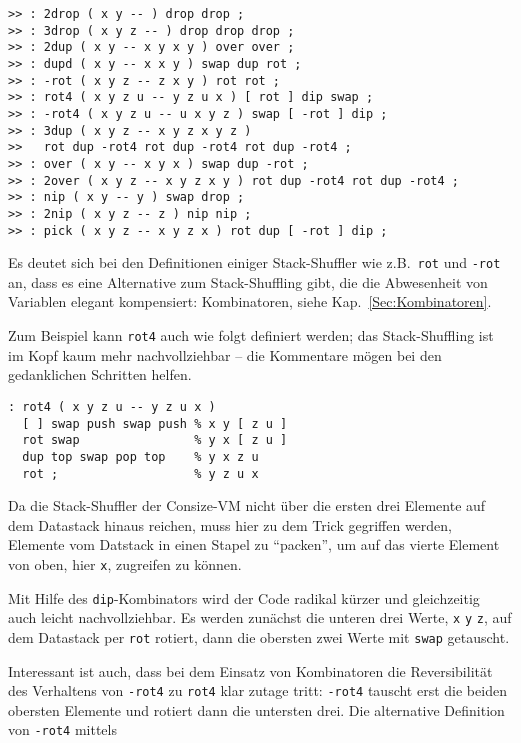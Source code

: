 \begin{verbatim}
>> : 2drop ( x y -- ) drop drop ;
>> : 3drop ( x y z -- ) drop drop drop ;
>> : 2dup ( x y -- x y x y ) over over ;
>> : dupd ( x y -- x x y ) swap dup rot ;
>> : -rot ( x y z -- z x y ) rot rot ;
>> : rot4 ( x y z u -- y z u x ) [ rot ] dip swap ;
>> : -rot4 ( x y z u -- u x y z ) swap [ -rot ] dip ;
>> : 3dup ( x y z -- x y z x y z )
>>   rot dup -rot4 rot dup -rot4 rot dup -rot4 ;
>> : over ( x y -- x y x ) swap dup -rot ;
>> : 2over ( x y z -- x y z x y ) rot dup -rot4 rot dup -rot4 ;
>> : nip ( x y -- y ) swap drop ;
>> : 2nip ( x y z -- z ) nip nip ;
>> : pick ( x y z -- x y z x ) rot dup [ -rot ] dip ;
\end{verbatim}

Es deutet sich bei den Definitionen einiger Stack-Shuffler wie z.B.\ \verb|rot| und \verb|-rot| an, dass es eine Alternative zum Stack-Shuffling gibt, die die Abwesenheit von Variablen elegant kompensiert: Kombinatoren, siehe Kap.~\ref{Sec:Kombinatoren}.

Zum Beispiel kann \verb|rot4| auch wie folgt definiert werden; das Stack-Shuffling ist im Kopf kaum mehr nachvollziehbar -- die Kommentare mögen bei den gedanklichen Schritten helfen.

\begin{verbatim}
: rot4 ( x y z u -- y z u x )
  [ ] swap push swap push % x y [ z u ]
  rot swap                % y x [ z u ]
  dup top swap pop top    % y x z u
  rot ;                   % y z u x
\end{verbatim}

Da die Stack-Shuffler der Consize-VM nicht über die ersten drei Elemente auf dem Datastack hinaus reichen, muss hier zu dem Trick gegriffen werden, Elemente vom Datstack in einen Stapel zu "`packen"', um auf das vierte Element von oben, hier \verb|x|, zugreifen zu können.

Mit Hilfe des \verb|dip|-Kombinators wird der Code radikal kürzer und gleichzeitig auch leicht nachvollziehbar. Es werden zunächst die unteren drei Werte, \verb|x| \verb|y| \verb|z|, auf dem Datastack per \verb|rot| rotiert, dann die obersten zwei Werte mit \verb|swap| getauscht.

Interessant ist auch, dass bei dem Einsatz von Kombinatoren die Reversibilität des Verhaltens von \verb|-rot4| zu \verb|rot4| klar zutage tritt: \verb|-rot4| tauscht erst die beiden obersten Elemente und rotiert dann die untersten drei. Die alternative Definition von \verb|-rot4| mittels

